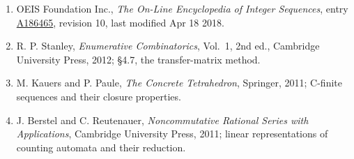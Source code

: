 \documentclass[11pt]{article}
\theoremstyle{definition}
\begin{document}
\begin{enumerate}

\item OEIS Foundation Inc., \emph{The On-Line Encyclopedia of Integer Sequences}, entry \href{https://oeis.org/A186465}{A186465}, revision 10, last modified Apr 18 2018.

\item R. P. Stanley, \emph{Enumerative Combinatorics}, Vol.~1, 2nd ed., Cambridge University Press, 2012; \S4.7, the transfer-matrix method.

\item M. Kauers and P. Paule, \emph{The Concrete Tetrahedron}, Springer, 2011; C-finite sequences and their closure properties.

\item J. Berstel and C. Reutenauer, \emph{Noncommutative Rational Series with Applications}, Cambridge University Press, 2011; linear representations of counting automata and their reduction.

\end{enumerate}
\end{document}
